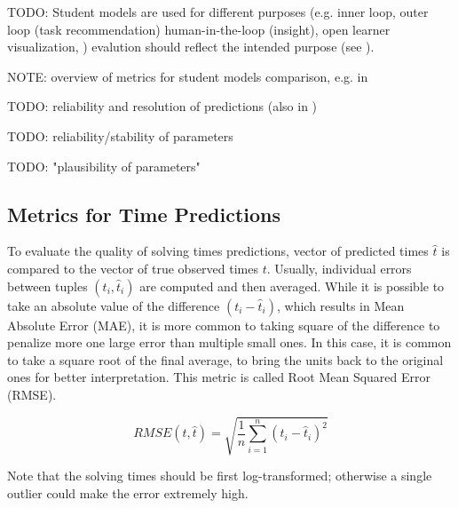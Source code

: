 TODO: Student models are used for different purposes
(e.g. inner loop, outer loop (task recommendation) human-in-the-loop (insight),
open learner visualization, )
evalution should reflect the intended purpose
(see \cite{pelanek-learner-modeling}).

NOTE: overview of metrics for student models comparison, e.g. in \cite{pelanek-evaluation-student-models}

TODO: reliability and resolution of predictions (also in \cite{pelanek-evaluation-student-models})

TODO: reliability/stability of parameters

TODO: "plausibility of parameters" \cite{learner-models-integration-skills}


\subsection{Metrics for Time Predictions}
\label{sec:metrics-for-time-predictions}

To evaluate the quality of solving times predictions,
  vector of predicted times $\hat{t}$ is compared to
  the vector of true observed times $t$.
Usually, individual errors between tuples $(t_i, \hat{t}_i)$ are computed
  and then averaged.
While it is possible to take an absolute value of the
  difference $(t_i - \hat{t}_i)$,
  which results in Mean Absolute Error (MAE),
it is more common to taking square of the difference
  to penalize more one large error than multiple small ones.
In this case, it is common to take a square root of the final
  average, to bring the units back to the original ones
  for better interpretation.
This metric is called Root Mean Squared Error (RMSE).

$$
RMSE(t, \hat{t}) = \sqrt{\frac{1}{n} \sum_{i=1}^n (t_i - \hat{t}_i)^2}
$$

Note that the solving times should be first log-transformed;
  otherwise a single outlier could make the error extremely high.


